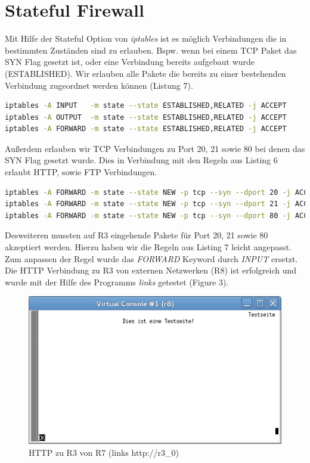 \documentclass[a4paper,10pt]{article}
\begin{document}
\section{Stateful Firewall}
Mit Hilfe der Stateful Option von \textit{iptables} ist es möglich Verbindungen die in bestimmten Zuständen sind zu erlauben. Bspw. wenn
bei einem TCP Paket das SYN Flag gesetzt ist, oder eine Verbindung bereits aufgebaut wurde (ESTABLISHED). Wir erlauben alle Pakete die
bereits zu einer bestehenden Verbindung zugeordnet werden können (Listung 7).
\begin{lstlisting}[language=bash,caption={Stateful ESTABLISHED,RELATED}]
iptables -A INPUT   -m state --state ESTABLISHED,RELATED -j ACCEPT
iptables -A OUTPUT  -m state --state ESTABLISHED,RELATED -j ACCEPT
iptables -A FORWARD -m state --state ESTABLISHED,RELATED -j ACCEPT
\end{lstlisting}
Außerdem erlauben wir TCP Verbindungen zu Port 20, 21 sowie 80 bei denen das SYN Flag gesetzt wurde. Dies in Verbindung mit den Regeln
aus Listing 6 erlaubt HTTP, sowie FTP Verbindungen.
\begin{lstlisting}[language=bash,caption={Stateful NEW, SYN FLAG}]
iptables -A FORWARD -m state --state NEW -p tcp --syn --dport 20 -j ACCEPT
iptables -A FORWARD -m state --state NEW -p tcp --syn --dport 21 -j ACCEPT
iptables -A FORWARD -m state --state NEW -p tcp --syn --dport 80 -j ACCEPT
\end{lstlisting}
Desweiteren mussten auf R3 eingehende Pakete für Port 20, 21 sowie 80 akzeptiert werden. Hierzu haben wir die Regeln aus Listing 7 leicht angepasst.
Zum anpassen der Regel wurde das \textit{FORWARD} Keyword durch \textit{INPUT} ersetzt.\\
\newline
Die HTTP Verbindung zu R3 von externen Netzwerken (R8) ist erfolgreich und wurde mit der Hilfe des Programms \textit{links} getestet (Figure 3).
\begin{figure}[h]
  \centering\includegraphics[scale=.5]{http_r8_to_r3.png}
  \caption{HTTP zu R3 von R7 (links http://r3\_0)}
\end{figure}
\end{document}
